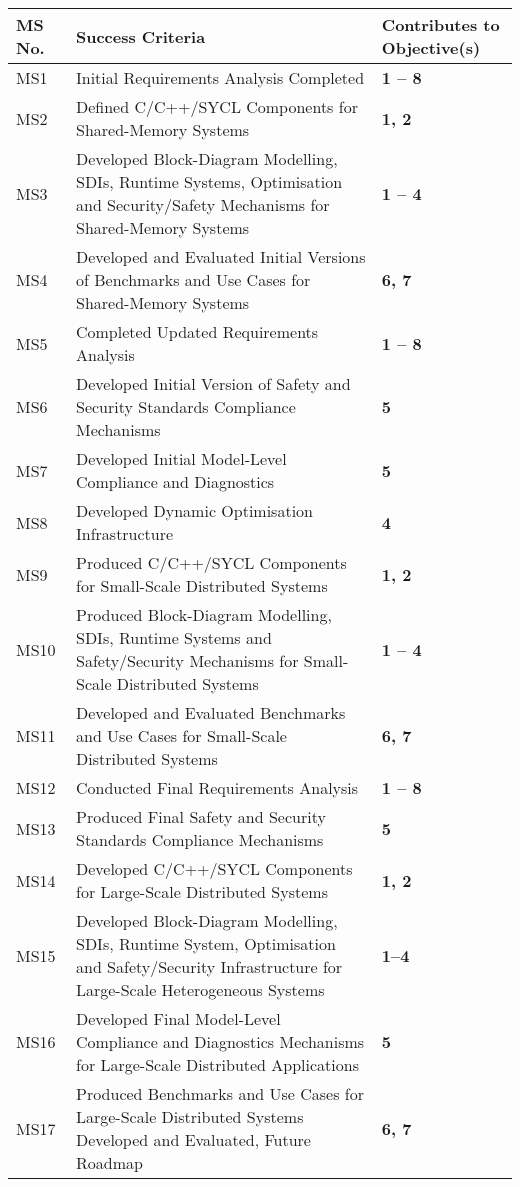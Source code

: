 \documentclass[a4paper,11pt]{article}
\begin{document}
\setcounter{ms}{0}
\vspace{20pt}
\begin{center}
\begin{tabular*}{\textwidth}{|p{1.2cm}|p{13.3cm}|p{2.2cm}|}\hline
\textbf{MS No.} & \textbf{Success Criteria} & \textbf{Contributes to
  Objective(s)} \\
  \hline
MS1 & Initial Requirements Analysis Completed & \textbf{1 -- 8} \\
  \hline
MS2 & Defined C/C++/SYCL Components for Shared-Memory Systems  & \textbf{1, 2} \\
  \hline
MS3 & Developed Block-Diagram Modelling, SDIs, Runtime Systems, Optimisation and Security/Safety Mechanisms for Shared-Memory Systems & \textbf{1 -- 4} \\
  \hline
MS4 & Developed and Evaluated Initial Versions of Benchmarks and Use Cases for Shared-Memory Systems  & \textbf{6, 7} \\
  \hline
MS5 &  Completed Updated Requirements Analysis & \textbf{1 -- 8} \\
  \hline
MS6 & Developed Initial Version of Safety and Security Standards Compliance Mechanisms & \textbf{5} \\
  \hline
MS7 & Developed Initial Model-Level Compliance and Diagnostics & \textbf{5} \\
  \hline
MS8 &  Developed Dynamic Optimisation Infrastructure & \textbf{4} \\
  \hline
MS9 & Produced C/C++/SYCL Components for Small-Scale Distributed Systems  & \textbf{1, 2} \\
  \hline
MS10 & Produced Block-Diagram Modelling, SDIs, Runtime Systems and Safety/Security Mechanisms for Small-Scale Distributed Systems & \textbf{1 -- 4} \\
  \hline
MS11 & Developed and Evaluated Benchmarks and Use Cases for Small-Scale Distributed Systems  & \textbf{6, 7} \\
  \hline
MS12 & Conducted Final Requirements Analysis & \textbf{1 -- 8} \\
  \hline
MS13 & Produced Final Safety and Security Standards Compliance Mechanisms  & \textbf{5} \\
  \hline
MS14 & Developed  C/C++/SYCL Components for Large-Scale Distributed Systems  & \textbf{1, 2} \\
  \hline
MS15 & Developed Block-Diagram Modelling, SDIs, Runtime System, Optimisation and Safety/Security Infrastructure for Large-Scale Heterogeneous Systems  & \textbf{1--4} \\
  \hline
MS16 & Developed Final Model-Level Compliance and Diagnostics Mechanisms for Large-Scale Distributed Applications & \textbf{5} \\
  \hline
MS17 & Produced Benchmarks and Use Cases for Large-Scale Distributed Systems Developed and Evaluated, Future Roadmap  & \textbf{6, 7} \\ \hline
\end{tabular*}
\end{center}
\end{document}

